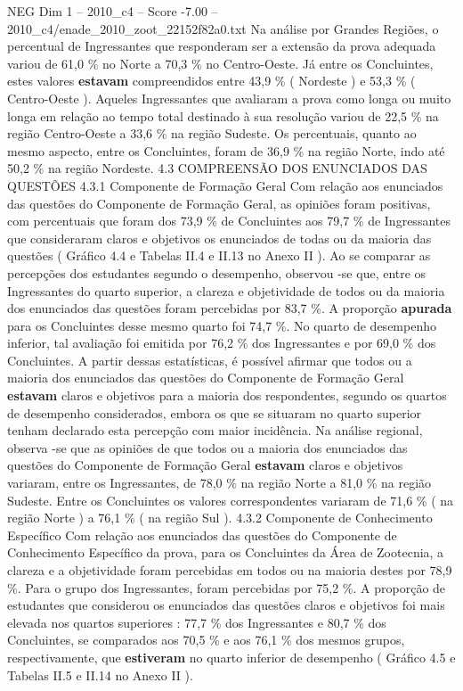 \begin{textsample}{NEG Dim 1 – 2010\_c4 – Score -7.00 – 2010\_c4/enade\_2010\_zoot\_22152f82a0.txt}
Na análise por Grandes Regiões, o percentual de Ingressantes que responderam ser a extensão da prova adequada variou de 61,0 \% no Norte a 70,3 \% no Centro-Oeste.
Já entre os Concluintes, estes valores \textbf{estavam} compreendidos entre 43,9 \% ( Nordeste ) e 53,3 \% ( Centro-Oeste ).
Aqueles Ingressantes que avaliaram a prova como longa ou muito longa em relação ao tempo total destinado à sua resolução variou de 22,5 \% na região Centro-Oeste a 33,6 \% na região Sudeste.
Os percentuais, quanto ao mesmo aspecto, entre os Concluintes, foram de 36,9 \% na região Norte, indo até 50,2 \% na região Nordeste. 4.3 COMPREENSÃO DOS ENUNCIADOS DAS QUESTÕES 4.3.1 Componente de Formação Geral Com relação aos enunciados das questões do Componente de Formação Geral, as opiniões foram positivas, com percentuais que foram dos 73,9 \% de Concluintes aos 79,7 \% de Ingressantes que consideraram claros e objetivos os enunciados de todas ou da maioria das questões ( Gráfico 4.4 e Tabelas II.4 e II.13 no Anexo II ).
Ao se comparar as percepções dos estudantes segundo o desempenho, observou -se que, entre os Ingressantes do quarto superior, a clareza e objetividade de todos ou da maioria dos enunciados das questões foram percebidas por 83,7 \%.
A proporção \textbf{apurada} para os Concluintes desse mesmo quarto foi 74,7 \%.
No quarto de desempenho inferior, tal avaliação foi emitida por 76,2 \% dos Ingressantes e por 69,0 \% dos Concluintes.
A partir dessas estatísticas, é possível afirmar que todos ou a maioria dos enunciados das questões do Componente de Formação Geral \textbf{estavam} claros e objetivos para a maioria dos respondentes, segundo os quartos de desempenho considerados, embora os que se situaram no quarto superior tenham declarado esta percepção com maior incidência.
Na análise regional, observa -se que as opiniões de que todos ou a maioria dos enunciados das questões do Componente de Formação Geral \textbf{estavam} claros e objetivos variaram, entre os Ingressantes, de 78,0 \% na região Norte a 81,0 \% na região Sudeste.
Entre os Concluintes os valores correspondentes variaram de 71,6 \% ( na região Norte ) a 76,1 \% ( na região Sul ). 4.3.2 Componente de Conhecimento Específico Com relação aos enunciados das questões do Componente de Conhecimento Específico da prova, para os Concluintes da Área de Zootecnia, a clareza e a objetividade foram percebidas em todos ou na maioria destes por 78,9 \%.
Para o grupo dos Ingressantes, foram percebidas por 75,2 \%.
A proporção de estudantes que considerou os enunciados das questões claros e objetivos foi mais elevada nos quartos superiores : 77,7 \% dos Ingressantes e 80,7 \% dos Concluintes, se comparados aos 70,5 \% e aos 76,1 \% dos mesmos grupos, respectivamente, que \textbf{estiveram} no quarto inferior de desempenho ( Gráfico 4.5 e Tabelas II.5 e II.14 no Anexo II ).

\end{textsample}
